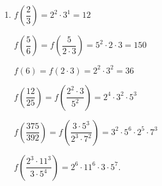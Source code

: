 \documentclass[11pt]{article}
\begin{document}
\begin{enumerate}
\item \begin{multicols}{2}
$f \left( \dfrac{2}{3} \right) = {2^2} \cdot {3^1} = 12$ 

$f \left( \dfrac{5}{6} \right) = f \left( \dfrac{5}{2 \cdot 3} \right) = {5^2}\cdot {2 \cdot 3} = 150$ 

$f \left( 6 \right) = f(2 \cdot 3) = 2^2 \cdot 3^2 = 36$ 

$f \left( \dfrac{12}{25} \right) = f \left( \dfrac{2^2 \cdot 3}{5^2} \right) = {2^4 \cdot 3^2}\cdot {5^3}$ 

$f \left( \dfrac{375}{392} \right) = f \left( \dfrac{3 \cdot 5^3}{2^3 \cdot 7^2} \right) = {3^2 \cdot 5^6} \cdot {2^5 \cdot 7^3}$

$f \left( \dfrac{2^3 \cdot 11^3}{3 \cdot 5^4} \right) = 2^6 \cdot 11^6 \cdot 3 \cdot 5^7$.
\end{multicols}



\end{enumerate}
\end{document}
